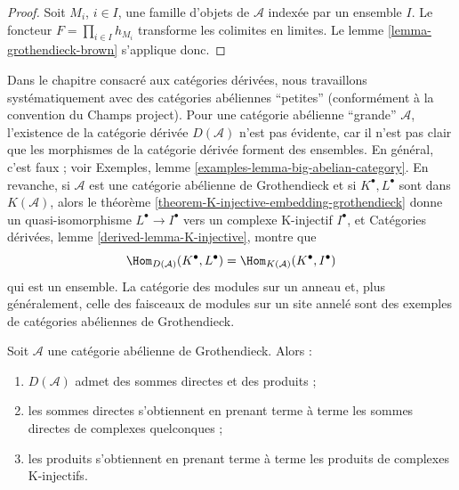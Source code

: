 \begin{proof}
Soit $M_i$, $i \in I$, une famille d'objets de $\mathcal{A}$ indexée par un
ensemble $I$. Le foncteur $F = \prod_{i \in I} h_{M_i}$ transforme les
colimites en limites. Le
lemme \ref{lemma-grothendieck-brown} s'applique donc.
\end{proof}

\begin{remark}
\label{remark-existence-D}
Dans le chapitre consacré aux catégories dérivées, nous travaillons
systématiquement avec des catégories abéliennes ``petites'' (conformément à
la convention du Champs project). Pour une catégorie abélienne ``grande''
$\mathcal{A}$, l'existence de la catégorie dérivée $D(\mathcal{A})$ n'est pas
évidente, car il n'est pas clair que les morphismes de la catégorie dérivée
forment des ensembles. En général, c'est faux ; voir
Exemples, lemme \ref{examples-lemma-big-abelian-category}.
En revanche, si $\mathcal{A}$ est une catégorie abélienne de Grothendieck et si
$K^\bullet, L^\bullet$ sont dans $K(\mathcal{A})$, alors le
théorème \ref{theorem-K-injective-embedding-grothendieck} donne un
quasi-isomorphisme $L^\bullet \to I^\bullet$ vers un complexe K-injectif
$I^\bullet$, et Catégories dérivées,
lemme \ref{derived-lemma-K-injective}, montre que
$$
\Hom_{D(\mathcal{A})}(K^\bullet, L^\bullet) =
\Hom_{K(\mathcal{A})}(K^\bullet, I^\bullet)
$$
qui est un ensemble. La catégorie des modules sur un anneau et, plus
généralement, celle des faisceaux de modules sur un site annelé sont des
exemples de catégories abéliennes de Grothendieck.
\end{remark}

\begin{lemma}
\label{lemma-derived-products}
Soit $\mathcal{A}$ une catégorie abélienne de Grothendieck. Alors :
\begin{enumerate}
\item $D(\mathcal{A})$ admet des sommes directes et des produits ;
\item les sommes directes s'obtiennent en prenant terme à terme les sommes
directes de complexes quelconques ;
\item les produits s'obtiennent en prenant terme à terme les produits de
complexes K-injectifs.
\end{enumerate}
\end{lemma}

